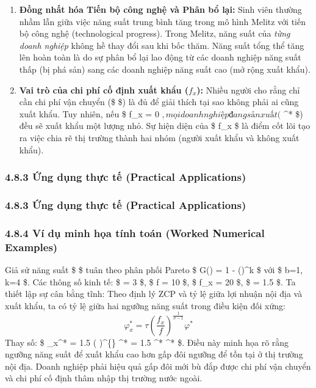 \documentclass[
]{article}
\providecommand{\tightlist}{%
  \setlength{\itemsep}{0pt}\setlength{\parskip}{0pt}}
\begin{document}
\begin{enumerate}
\def\labelenumi{\arabic{enumi}.}
\tightlist
\item
  \textbf{Đồng nhất hóa Tiến bộ công nghệ và Phân bổ lại:} Sinh viên
  thường nhầm lẫn giữa việc năng suất trung bình tăng trong mô hình
  Melitz với tiến bộ công nghệ (technological progress). Trong Melitz,
  năng suất của \emph{từng doanh nghiệp} không hề thay đổi sau khi bốc
  thăm. Năng suất tổng thể tăng lên hoàn toàn là do sự phân bổ lại lao
  động từ các doanh nghiệp năng suất thấp (bị phá sản) sang các doanh
  nghiệp năng suất cao (mở rộng xuất khẩu).
\item
  \textbf{Vai trò của chi phí cố định xuất khẩu (\(f_x\)):} Nhiều người
  cho rằng chỉ cần chi phí vận chuyển (\$ \tau \$) là đủ để giải thích
  tại sao không phải ai cũng xuất khẩu. Tuy nhiên, nếu \$ f\_x = 0
  \(, mọi doanh nghiệp đang sản xuất (\) \varphi \ge \varphi\^{}* \$)
  đều sẽ xuất khẩu một lượng nhỏ. Sự hiện diện của \$ f\_x \$ là điểm
  cốt lõi tạo ra việc chia rẽ thị trường thành hai nhóm (người xuất khẩu
  và không xuất khẩu).
\end{enumerate}

\subsubsection{4.8.3 Ứng dụng thực tế (Practical
Applications)}\label{ux1ee9ng-dux1ee5ng-thux1ef1c-tux1ebf-practical-applications}

\subsubsection{4.8.3 Ứng dụng thực tế (Practical
Applications)}\label{ux1ee9ng-dux1ee5ng-thux1ef1c-tux1ebf-practical-applications-1}

\subsubsection{4.8.4 Ví dụ minh họa tính toán (Worked Numerical
Examples)}\label{vuxed-dux1ee5-minh-hux1ecda-tuxednh-touxe1n-worked-numerical-examples}

Giả sử năng suất \$ \varphi \$ tuân theo phân phối Pareto \$ G(\varphi)
= 1 - \left(\right)\^{}k \$ với \$ b=1, k=4 \$. Các
thông số kinh tế: \$ \sigma = 3 \$, \$ f = 10 \$, \$ f\_x = 20 \$, \$
\tau = 1.5 \$. Ta thiết lập sự cân bằng tĩnh: Theo định lý ZCP và tỷ lệ
giữa lợi nhuận nội địa và xuất khẩu, ta có tỷ lệ giữa hai ngưỡng năng
suất trong điều kiện đối xứng:
\[ \varphi_x^* = \tau \left( \frac{f_x}{f} \right)^{\frac{1}{\sigma-1}} \varphi^* \]
Thay số: \$ \varphi\_x\^{}* = 1.5 \times \left( 
\right)\^{}\{\} \varphi\^{}* = 1.5 \times {}
\varphi\^{}*  \varphi\^{}* \$. Điều này minh họa rõ rằng
ngưỡng năng suất để xuất khẩu cao hơn gấp đôi ngưỡng để tồn tại ở thị
trường nội địa. Doanh nghiệp phải hiệu quả gấp đôi mới bù đắp được chi
phí vận chuyển và chi phí cố định thâm nhập thị trường nước ngoài.
\end{document}
